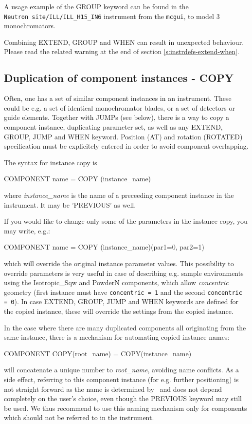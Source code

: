 A usage example of the GROUP keyword can be found in the \\
\verb+Neutron site/ILL/ILL_H15_IN6+ instrument from the \verb+mcgui+, to model 3 monochromators.

Combining EXTEND, GROUP and WHEN can result in unexpected behaviour. Please read the related warning at the end of section \ref{s:instrdefs-extend-when}.

\subsection{Duplication of component instances - COPY}
\label{s:instrdefs-extend-copy}

Often, one has a set of similar component instances in an instrument. These
could be e.g. a set of identical monochromator blades, or a set of detectors or
guide elements.  Together with JUMPs (see below), there is a way to copy a
component instance, duplicating parameter set, as well as any EXTEND, GROUP,
JUMP and WHEN keyword.  Position (AT) and rotation (ROTATED) specification must
be explicitely entered in order to avoid component overlapping.

The syntax for instance copy is
\begin{mcstas}
COMPONENT name = COPY (instance_name)
\end{mcstas}
where {\it instance\_name} is the name of a preceeding component instance in the
instrument. It may be 'PREVIOUS' as well.

If you would like to change only some of the parameters in the instance copy, you may write, e.g.:

\begin{mcstas}
COMPONENT name = COPY (instance_name)(par1=0, par2=1)
\end{mcstas}

which will override the original instance parameter values. This possibility to
override parameters is very useful in case of describing e.g. sample environments
using the Isotropic\_Sqw and PowderN components, which allow \emph{concentric}
geometry (first instance must have \verb+concentric = 1+ and the second
\verb+concentric = 0+). In case EXTEND, GROUP, JUMP and WHEN keywords are
defined for the copied instance, these will override the settings from the
copied instance.


In the case where there are many duplicated components all originating from the
same instance, there is a mechanism for automating copied instance names:
\begin{mcstas}
COMPONENT COPY(root_name) = COPY(instance_name)
\end{mcstas}
will concatenate a unique number to {\it root\_name}, avoiding name
conflicts. As a side effect, referring to this component instance (for
e.g. further positioning) is not straight forward as the name is determined by
\MCS\ and does not depend completely on the user's choice, even though the
PREVIOUS keyword may still be used. We thus recommend to use this naming
mechanism only for components which should not be referred to in the instrument.

